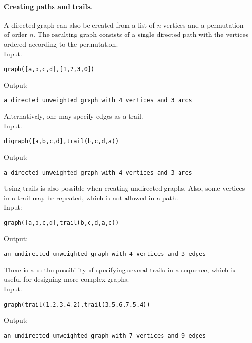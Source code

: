 \documentclass[a4paper,11pt]{article}
\begin{document}
\paragraph{Creating paths and trails.}
A directed graph can also be created from a list of $ n $ vertices and a permutation of order $ n $. The resulting graph consists of a single directed path with the vertices ordered according to the permutation.\\
Input:
\begin{center}
  \tt graph([a,b,c,d],[1,2,3,0])
\end{center}
Output:
\begin{center}
  \tt a directed unweighted graph with 4 vertices and 3 arcs
\end{center}
Alternatively, one may specify edges as a trail.\\
Input:
\begin{center}
  \tt digraph([a,b,c,d],trail(b,c,d,a))
\end{center}
Output:
\begin{center}
  \tt a directed unweighted graph with 4 vertices and 3 arcs
\end{center}
Using trails is also possible when creating undirected graphs. Also, some vertices in a trail may be repeated, which is not allowed in a path.\\
Input:
\begin{center}
  \tt graph([a,b,c,d],trail(b,c,d,a,c))
\end{center}
Output:
\begin{center}
  \tt an undirected unweighted graph with 4 vertices and 3 edges
\end{center}
There is also the possibility of specifying several trails in a sequence, which is useful for designing more complex graphs.\\
Input:
\begin{center}
  \tt graph(trail(1,2,3,4,2),trail(3,5,6,7,5,4))
\end{center}
Output:
\begin{center}
  \tt an undirected unweighted graph with 7 vertices and 9 edges
\end{center}
\end{document}
